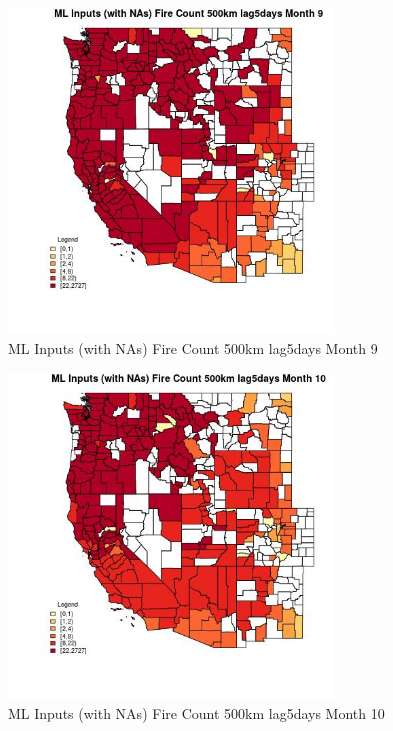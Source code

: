 \begin{figure} 
\centering  
\includegraphics[width=0.77\textwidth]{Code_Outputs/Report_ML_input_PM25_Step4_part_f_de_duplicated_aves_prioritize_24hr_obswNAs_CountyFire_Count_500km_lag5daysmedianMonth9.jpg} 
\caption{\label{fig:Report_ML_input_PM25_Step4_part_f_de_duplicated_aves_prioritize_24hr_obswNAsCountyFire_Count_500km_lag5daysmedianMonth9}ML Inputs (with NAs) Fire Count 500km lag5days Month 9} 
\end{figure} 
 

\begin{figure} 
\centering  
\includegraphics[width=0.77\textwidth]{Code_Outputs/Report_ML_input_PM25_Step4_part_f_de_duplicated_aves_prioritize_24hr_obswNAs_CountyFire_Count_500km_lag5daysmedianMonth10.jpg} 
\caption{\label{fig:Report_ML_input_PM25_Step4_part_f_de_duplicated_aves_prioritize_24hr_obswNAsCountyFire_Count_500km_lag5daysmedianMonth10}ML Inputs (with NAs) Fire Count 500km lag5days Month 10} 
\end{figure} 
 

